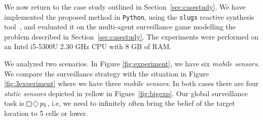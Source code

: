 We now return to the case study outlined in Section~\ref{sec:casestudy}. We have implemented the proposed method in \texttt{Python}, using the \texttt{slugs} reactive synthesis tool~\cite{EhlersR16}, and evaluated it on the multi-agent surveillance game modelling the problem described in Section~\ref{sec:casestudy}. The experiments were performed on an Intel i5-5300U 2.30 GHz CPU with 8 GB of RAM.

 We analyzed two scenarios. In Figure \ref{fig:experiment}, we have six \emph{mobile sensors}. We compare the surveillance strategy with the situation in Figure \ref{fig:3experiment} where we have three \emph{mobile sensors}. In both cases there are four \emph{static sensors} depicted in yellow in Figure~\ref{fig:bigexp}. Our global surveillance task is $\LTLsquare \LTLdiamond p_5$, i.e, we need to infinitely often bring the belief of the target location to 5 cells or lower. 


